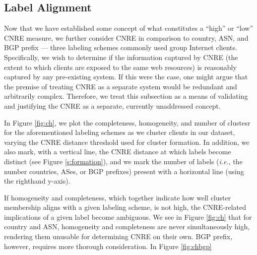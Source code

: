 \subsection{Label Alignment}
\label{s:labelalgn}

Now that we have established some concept of what constitutes a ``high'' or
``low'' CNRE measure, we further consider CNRE in comparison to country, ASN,
and BGP prefix --- three labeling schemes commonly used group Internet clients.
Specifically, we wish to determine if the information captured by
CNRE (the extent to which clients are exposed to the same web resources) is
reasonably captured by any pre-existing system. If this were the case, one might
argue that the premise of treating CNRE as a separate system would be redundant
and arbitrarily complex. Therefore, we treat this subsection as a means of
validating and justifying the CNRE as a separate, currently unaddressed concept.

In Figure \ref{fig:ch}, we plot the completeness, homogeneity, and number of
clustesr for the aforementioned labeling schemes as we cluster clients in our
dataset, varying the CNRE distance threshold used for cluster formation. In
addition, we also mark, with a vertical line, the CNRE distance at which labels
become distinct (see Figure \ref{s:formation}), and we mark the number of labels
(\emph{i.e.}, the number countries, ASes, or BGP prefixes) present with a
horizontal line (using the righthand y-axis). 

If homogeneity and completeness, which together indicate how well cluster
membership aligns with a given labeling scheme, is not high, the CNRE-related
implications of a given label become ambiguous. We see in Figure \ref{fig:ch}
that for country and ASN, homogeneity and completeness are never simultaneously
high, rendering them unusable for determining CNRE on their own. BGP prefix,
however, requires more thorough consideration. In Figure \ref{fig:chbgp}

